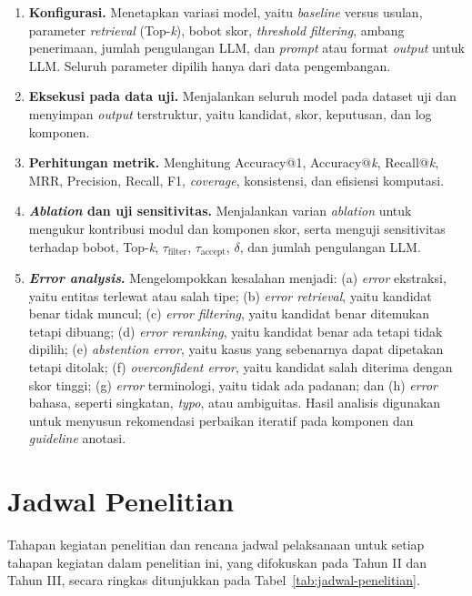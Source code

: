 \begin{enumerate}
    \item \textbf{Konfigurasi.} Menetapkan variasi model, yaitu \textit{baseline} versus usulan, parameter \textit{retrieval} (Top-\textit{k}), bobot skor, \textit{threshold filtering}, ambang penerimaan, jumlah pengulangan LLM, dan \textit{prompt} atau format \textit{output} untuk LLM. Seluruh parameter dipilih hanya dari data pengembangan.
    \item \textbf{Eksekusi pada data uji.} Menjalankan seluruh model pada dataset uji dan menyimpan \textit{output} terstruktur, yaitu kandidat, skor, keputusan, dan log komponen.
    \item \textbf{Perhitungan metrik.} Menghitung Accuracy@1, Accuracy@\textit{k}, Recall@\textit{k}, MRR, Precision, Recall, F1, \textit{coverage}, konsistensi, dan efisiensi komputasi.
    \item \textbf{\textit{Ablation} dan uji sensitivitas.} Menjalankan varian \textit{ablation} untuk mengukur kontribusi modul dan komponen skor, serta menguji sensitivitas terhadap bobot, Top-\textit{k}, $\tau_{\mathrm{filter}}$, $\tau_{\mathrm{accept}}$, $\delta$, dan jumlah pengulangan LLM.
    \item \textbf{\textit{Error analysis}.} Mengelompokkan kesalahan menjadi: (a) \textit{error} ekstraksi, yaitu entitas terlewat atau salah tipe; (b) \textit{error retrieval}, yaitu kandidat benar tidak muncul; (c) \textit{error filtering}, yaitu kandidat benar ditemukan tetapi dibuang; (d) \textit{error reranking}, yaitu kandidat benar ada tetapi tidak dipilih; (e) \textit{abstention error}, yaitu kasus yang sebenarnya dapat dipetakan tetapi ditolak; (f) \textit{overconfident error}, yaitu kandidat salah diterima dengan skor tinggi; (g) \textit{error} terminologi, yaitu tidak ada padanan; dan (h) \textit{error} bahasa, seperti singkatan, \textit{typo}, atau ambiguitas. Hasil analisis digunakan untuk menyusun rekomendasi perbaikan iteratif pada komponen dan \textit{guideline} anotasi.
\end{enumerate}

\section{Jadwal Penelitian}

Tahapan kegiatan penelitian dan rencana jadwal pelaksanaan untuk setiap tahapan kegiatan dalam penelitian ini, yang difokuskan pada Tahun II dan Tahun III, secara ringkas ditunjukkan pada Tabel~\ref{tab:jadwal-penelitian}.


